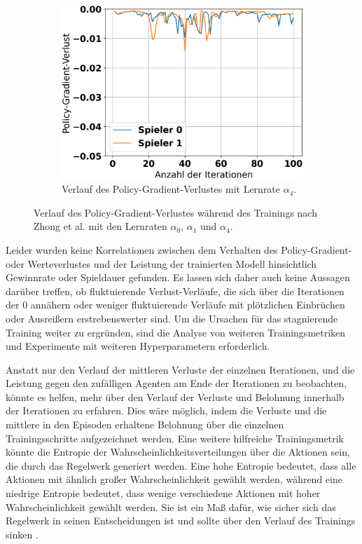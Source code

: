 \begin{figure}[ht!]
\begin{subfigure}[b]{0.32\textwidth}
		\includegraphics[width=\textwidth]{Bilder/ensemble-training/e_0_00001/graph_policy_gradient_losses.png}
		\caption{Verlauf des Policy-Gradient-Verlustes mit Lernrate $\alpha_4$.}
		\label{fig:f18}
	\end{subfigure}
	\caption{Verlauf des Policy-Gradient-Verlustes während des Trainings nach Zhong et al. mit den Lernraten $\alpha_0$, $\alpha_1$ und $\alpha_4$.}
\end{figure}

Leider wurden keine Korrelationen zwischen dem Verhalten des Policy-Gradient- oder Werteverlustes und der Leistung der trainierten Modell hinsichtlich Gewinnrate oder Spieldauer gefunden. Es lassen sich daher auch keine Aussagen darüber treffen, ob fluktuierende Verlust-Verläufe, die sich über die Iterationen der 0 annähern oder weniger fluktuierende Verläufe mit plötzlichen Einbrüchen oder Ausreißern erstrebenswerter sind. Um die Ursachen für das stagnierende Training weiter zu ergründen, sind die Analyse von weiteren Trainingsmetriken und Experimente mit weiteren Hyperparametern erforderlich.

Anstatt nur den Verlauf der mittleren Verluste der einzelnen Iterationen, und die Leistung gegen den zufälligen Agenten am Ende der Iterationen zu beobachten, könnte es helfen, mehr über den Verlauf der Verluste und Belohnung innerhalb der Iterationen zu erfahren. Dies wäre möglich, indem die Verluste und die mittlere in den Episoden erhaltene Belohnung über die einzelnen Trainingsschritte aufgezeichnet werden. Eine weitere hilfreiche Trainingsmetrik könnte die Entropie der Wahrscheinlichkeitsverteilungen über die Aktionen sein, die durch das Regelwerk generiert werden. Eine hohe Entropie bedeutet, dass alle Aktionen mit ähnlich großer Wahrscheinlichkeit gewählt werden, während eine niedrige Entropie bedeutet, dass wenige verschiedene Aktionen mit hoher Wahrscheinlichkeit gewählt werden. Sie ist ein Maß dafür, wie sicher sich das Regelwerk in seinen Entscheidungen ist und sollte über den Verlauf des Trainings sinken \cite{Lapan.2020}.

